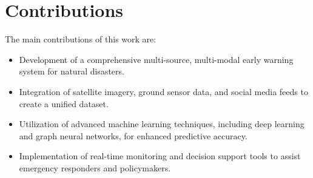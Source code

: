 \documentclass{article}
\begin{document}
\section{Contributions}
The main contributions of this work are:
\begin{itemize}
    \item Development of a comprehensive multi-source, multi-modal early warning system for natural disasters.
    \item Integration of satellite imagery, ground sensor data, and social media feeds to create a unified dataset.
    \item Utilization of advanced machine learning techniques, including deep learning and graph neural networks, for enhanced predictive accuracy.
    \item Implementation of real-time monitoring and decision support tools to assist emergency responders and policymakers.
\end{itemize}
\end{document}
